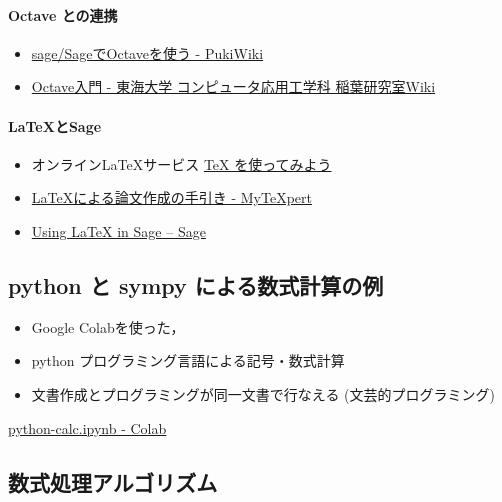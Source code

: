 \documentclass[dvipdfmx,11pat]{jarticle}
\begin{document}
\paragraph{Octave との連携}
\label{sec:org0e532fe}
\begin{itemize}
\item \href{http://www.pwv.co.jp/\%7Etake/TakeWiki/index.php?sage\%2FSage\%E3\%81\%A7Octave\%E3\%82\%92\%E4\%BD\%BF\%E3\%81\%86}{sage/SageでOctaveを使う - PukiWiki}
\item \href{http://www.inaba-lab.org/wiki/index.php/Octave\%E5\%85\%A5\%E9\%96\%80}{Octave入門 - 東海大学 コンピュータ応用工学科 稲葉研究室Wiki}
\end{itemize}
\paragraph{\LaTeX{}とSage}
\label{sec:orga75b932}
\begin{itemize}
\item オンライン\LaTeX{}サービス  \href{https://oku.edu.mie-u.ac.jp/\~okumura/texonweb/}{\TeX{} を使ってみよう}
\item \href{https://mytexpert.osdn.jp/index.php?LaTeX\%A4\%CB\%A4\%E8\%A4\%EB\%CF\%C0\%CA\%B8\%BA\%EE\%C0\%AE\%A4\%CE\%BC\%EA\%B0\%FA\%A4\%AD}{\LaTeX{}による論文作成の手引き - MyTeXpert}
\item \href{http://sage.math.gordon.edu/home/pub/51/}{Using \LaTeX{} in Sage -- Sage}
\end{itemize}
\subsection{python と sympy による数式計算の例}
\label{sec:org35550bf}



\begin{itemize}
\item Google Colabを使った，
\item python プログラミング言語による記号・数式計算
\item 文書作成とプログラミングが同一文書で行なえる (文芸的プログラミング)
\end{itemize}

\href{https://colab.research.google.com/drive/13-xrzx125aD3L4mzB5BhOHAUyLeV6kCX}{python-calc.ipynb - Colab} 
\subsection{数式処理アルゴリズム}
\label{sec:org3fc4773}
\end{document}
